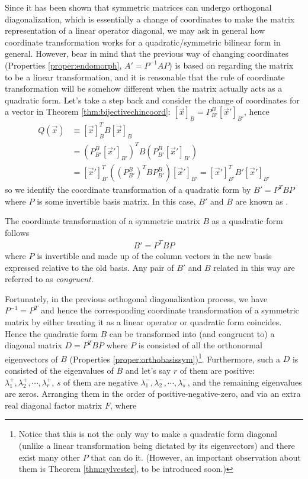 Since it has been shown that symmetric matrices can undergo orthogonal diagonalization, which is essentially a change of coordinates to make the matrix representation of a linear operator diagonal, we may ask in general how coordinate transformation works for a quadratic/symmetric bilinear form in general. However, bear in mind that the previous way of changing coordinates (Properties \ref{proper:endomorph}, $A' = P^{-1}AP$) is based on regarding the matrix to be a linear transformation, and it is reasonable that the rule of coordinate transformation will be somehow different when the matrix actually acts as a quadratic form. Let's take a step back and consider the change of coordinates for a vector in Theorem \ref{thm:bijectivechincoord}: $[\vec{x}]_B = P_{B'}^B [\vec{x}']_{B'}$, hence
\begin{align*}
Q(\vec{x}) &\equiv [\vec{x}]_B^T B [\vec{x}]_B \\
&= (P_{B'}^B [\vec{x}']_{B'})^T B (P_{B'}^B [\vec{x}']_{B'}) \\
&= [\vec{x}']_{B'}^T ((P_{B'}^B)^T B P_{B'}^B) [\vec{x}']_{B'} = [\vec{x}']_{B'}^T B' [\vec{x}']_{B'} 
\end{align*}
so we identify the coordinate transformation of a quadratic form by $B' = P^TBP$ where $P$ is some invertible basis matrix. In this case, $B'$ and $B$ are known as .
\begin{defn}
\label{defn:coordtransquad}
The coordinate transformation of a symmetric matrix $B$ as a quadratic form follows
\begin{align*}
B' = P^TBP
\end{align*}
where $P$ is invertible and made up of the column vectors in the new basis expressed relative to the old basis. Any pair of $B'$ and $B$ related in this way are referred to as \textit{congruent}.
\end{defn}
Fortunately, in the previous orthogonal diagonalization process, we have $P^{-1} = P^T$ and hence the corresponding coordinate transformation of a symmetric matrix by either treating it as a linear operator or quadratic form coincides. Hence the quadratic form $B$ can be transformed into (and congruent to) a diagonal matrix $D = P^TBP$ where $P$ is consisted of all the orthonormal eigenvectors of $B$ (Properties \ref{proper:orthobasissym})\footnote{Notice that this is not the only way to make a quadratic form diagonal (unlike a linear transformation being dictated by its eigenvectors) and there exist many other $P$ that can do it. (However, an important observation about them is Theorem \ref{thm:sylvester}, to be introduced soon.)}. Furthermore, such a $D$ is consisted of the eigenvalues of $B$ and let's say $r$ of them are positive: $\lambda_1^+, \lambda_2^+, \cdots, \lambda_r^+$, $s$ of them are negative $\lambda_1^-,  \lambda_2^-, \cdots, \lambda_s^-$, and the remaining eigenvalues are zeros. Arranging them in the order of positive-negative-zero, and via an extra real diagonal factor matrix $F$, where
